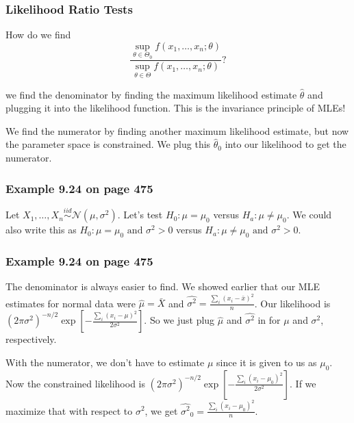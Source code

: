 \documentclass{beamer}
\begin{document}
\begin{frame}
\frametitle{Likelihood Ratio Tests}

How do we find
\[
\frac{ \sup_{\theta \in \Theta_0} f(x_1, \ldots, x_n ; \theta)}{ \sup_{\theta \in \Theta} f(x_1, \ldots, x_n ; \theta)}?
\]

we find the denominator by finding the maximum likelihood estimate $\hat{\theta}$ and plugging it into the likelihood function. This is the invariance principle of MLEs!
\newline

We find the numerator by finding another maximum likelihood estimate, but now the parameter space is constrained. We plug this $\hat{\theta}_0$ into our likelihood to get the numerator.

\end{frame}
\begin{frame}
\frametitle{Example 9.24 on page 475}

Let $X_1, \ldots, X_n \overset{iid}{\sim} \mathcal{N}(\mu, \sigma^2)$. Let's test $H_0: \mu = \mu_0$ versus $H_a: \mu \neq \mu_0$. We could also write this as $H_0: \mu = \mu_0 \text{ and } \sigma^2 > 0$ versus $H_a: \mu \neq \mu_0 \text{ and } \sigma^2 > 0$.


\end{frame}

\begin{frame}
\frametitle{Example 9.24 on page 475}

The denominator is always easier to find. We showed earlier that our MLE estimates for normal data were $\hat{\mu} = \bar{X}$ and $\hat{\sigma^2} = \frac{\sum_i(x_i - \bar{x})^2}{n}$. Our likelihood is $(2 \pi \sigma^2 )^{-n/2} \exp \left[ -\frac{\sum_i(x_i - \mu)^2}{2\sigma^2 } \right]$. So we just plug $\hat{\mu}$ and $\hat{\sigma^2}$ in for $\mu$ and $\sigma^2$, respectively.
\newline

With the numerator, we don't have to estimate $\mu$ since it is given to us as $\mu_0$. Now the constrained likelihood is $(2 \pi \sigma^2 )^{-n/2} \exp \left[ -\frac{\sum_i(x_i - \mu_0)^2}{2\sigma^2 } \right]$. If we maximize that with respect to $\sigma^2$, we get $\hat{\sigma^2}_0 = \frac{\sum_i(x_i - \mu_0)^2 }{n}$. 


\end{frame}
\end{document}
